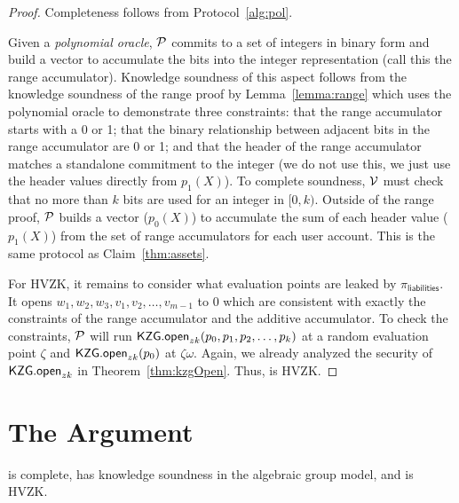 \begin{proof}
Completeness follows from Protocol~\ref{alg:pol}. 

Given a \textit{polynomial oracle}, $\mathcal{P}$ commits to a set of integers in binary form and build a vector to accumulate the bits into the integer representation (call this the range accumulator). Knowledge soundness of this aspect follows from the knowledge soundness of the range proof by Lemma~\ref{lemma:range} which uses the polynomial oracle to demonstrate three constraints: that the range accumulator starts with a 0 or 1; that the binary relationship between adjacent bits in the range accumulator are 0 or 1; and that the header of the range accumulator matches a standalone commitment to the integer (we do not use this, we just use the header values directly from $p_1(X)$). To complete soundness, $\mathcal{V}$ must check that no more than $k$ bits are used for an integer in $[0,k)$. Outside of the range proof, $\mathcal{P}$ builds a vector ($p_0(X)$) to accumulate the sum of each header value ($p_1(X)$) from the set of range accumulators for each user account. This is the same protocol as Claim~\ref{thm:assets}. 

For HVZK, it remains to consider what evaluation points are leaked by $\pi_\mathsf{liabilities}$. It opens $w_1,w_2,w_3,v_1,v_2,\dots,v_{m-1}$ to 0 which are consistent with exactly the constraints of the range accumulator and the additive accumulator. To check the constraints, $\mathcal{P}$ will run $\mathsf{KZG.open}_{zk}(p_0,p_1,p_2,\dots,p_k)$ at a random evaluation point $\zeta$ and $\mathsf{KZG.open}_{zk}(p_0)$ at $\zeta\omega$. Again, we already analyzed the security of $\mathsf{KZG.open}_{zk}$ in Theorem~\ref{thm:kzgOpen}. Thus, \pol is HVZK.
\end{proof}


\section{The \userproof Argument}

\begin{claim}
\label{thm:users} 
\userproof is complete, has knowledge soundness in the algebraic group model, and is HVZK. 
\end{claim}

